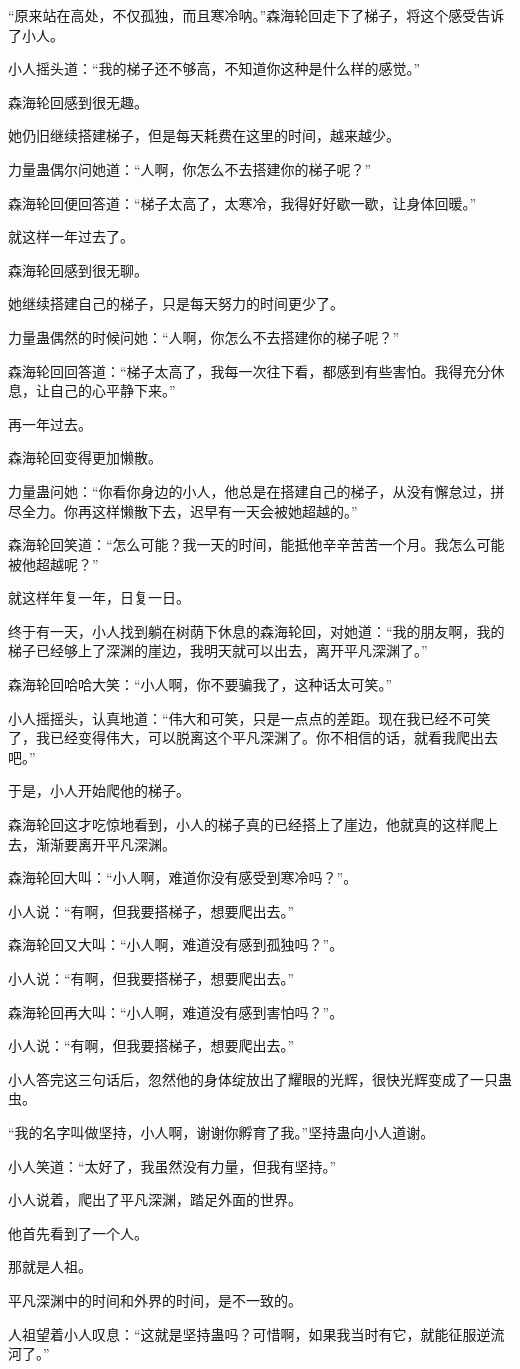 \begin{this_body}
“原来站在高处，不仅孤独，而且寒冷呐。”森海轮回走下了梯子，将这个感受告诉了小人。

小人摇头道：“我的梯子还不够高，不知道你这种是什么样的感觉。”

森海轮回感到很无趣。

她仍旧继续搭建梯子，但是每天耗费在这里的时间，越来越少。

力量蛊偶尔问她道：“人啊，你怎么不去搭建你的梯子呢？”

森海轮回便回答道：“梯子太高了，太寒冷，我得好好歇一歇，让身体回暖。”

就这样一年过去了。

森海轮回感到很无聊。

她继续搭建自己的梯子，只是每天努力的时间更少了。

力量蛊偶然的时候问她：“人啊，你怎么不去搭建你的梯子呢？”

森海轮回回答道：“梯子太高了，我每一次往下看，都感到有些害怕。我得充分休息，让自己的心平静下来。”

再一年过去。

森海轮回变得更加懒散。

力量蛊问她：“你看你身边的小人，他总是在搭建自己的梯子，从没有懈怠过，拼尽全力。你再这样懒散下去，迟早有一天会被她超越的。”

森海轮回笑道：“怎么可能？我一天的时间，能抵他辛辛苦苦一个月。我怎么可能被他超越呢？”

就这样年复一年，日复一日。

终于有一天，小人找到躺在树荫下休息的森海轮回，对她道：“我的朋友啊，我的梯子已经够上了深渊的崖边，我明天就可以出去，离开平凡深渊了。”

森海轮回哈哈大笑：“小人啊，你不要骗我了，这种话太可笑。”

小人摇摇头，认真地道：“伟大和可笑，只是一点点的差距。现在我已经不可笑了，我已经变得伟大，可以脱离这个平凡深渊了。你不相信的话，就看我爬出去吧。”

于是，小人开始爬他的梯子。

森海轮回这才吃惊地看到，小人的梯子真的已经搭上了崖边，他就真的这样爬上去，渐渐要离开平凡深渊。

森海轮回大叫：“小人啊，难道你没有感受到寒冷吗？”。

小人说：“有啊，但我要搭梯子，想要爬出去。”

森海轮回又大叫：“小人啊，难道没有感到孤独吗？”。

小人说：“有啊，但我要搭梯子，想要爬出去。”

森海轮回再大叫：“小人啊，难道没有感到害怕吗？”。

小人说：“有啊，但我要搭梯子，想要爬出去。”

小人答完这三句话后，忽然他的身体绽放出了耀眼的光辉，很快光辉变成了一只蛊虫。

“我的名字叫做坚持，小人啊，谢谢你孵育了我。”坚持蛊向小人道谢。

小人笑道：“太好了，我虽然没有力量，但我有坚持。”

小人说着，爬出了平凡深渊，踏足外面的世界。

他首先看到了一个人。

那就是人祖。

平凡深渊中的时间和外界的时间，是不一致的。

人祖望着小人叹息：“这就是坚持蛊吗？可惜啊，如果我当时有它，就能征服逆流河了。”

\end{this_body}

